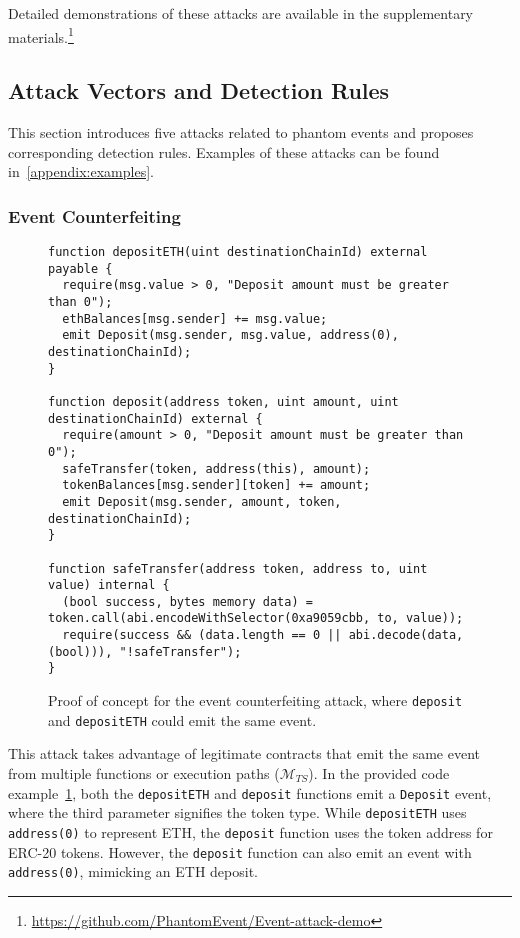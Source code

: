 Detailed demonstrations of these attacks are available in the supplementary materials.\footnote{\url{https://github.com/PhantomEvent/Event-attack-demo}}


\subsection{Attack Vectors and Detection Rules}
This section introduces five attacks related to phantom events and proposes corresponding detection rules. Examples of these attacks can be found in~\cref{appendix:examples}.

\subsubsection{Event Counterfeiting}\label{vec:attack1}

\begin{figure}
\small
\footnotesize
\begin{lstlisting}[language=Solidity]
function depositETH(uint destinationChainId) external payable {
  require(msg.value > 0, "Deposit amount must be greater than 0");
  ethBalances[msg.sender] += msg.value;
  emit Deposit(msg.sender, msg.value, address(0), destinationChainId);
}

function deposit(address token, uint amount, uint destinationChainId) external {
  require(amount > 0, "Deposit amount must be greater than 0");
  safeTransfer(token, address(this), amount);
  tokenBalances[msg.sender][token] += amount;
  emit Deposit(msg.sender, amount, token, destinationChainId);
}

function safeTransfer(address token, address to, uint value) internal {
  (bool success, bytes memory data) = token.call(abi.encodeWithSelector(0xa9059cbb, to, value));
  require(success && (data.length == 0 || abi.decode(data, (bool))), "!safeTransfer");
}
\end{lstlisting}
\caption{Proof of concept for the event counterfeiting attack, where \texttt{deposit} and
\texttt{depositETH} could emit the same event.}\label{code:1}
\end{figure}

This attack takes advantage of legitimate contracts that emit the same event from multiple functions or execution paths (\(\bm{\mathcal{M}}_{TS}\)). In the provided code example~\cref{code:1}, both the \texttt{depositETH} and \texttt{deposit} functions emit a \texttt{Deposit} event, where the third parameter signifies the token type. While \texttt{depositETH} uses \texttt{address(0)} to represent ETH, the \texttt{deposit} function uses the token address for ERC-20 tokens. However, the \texttt{deposit} function can also emit an event with \texttt{address(0)}, mimicking an ETH deposit.

